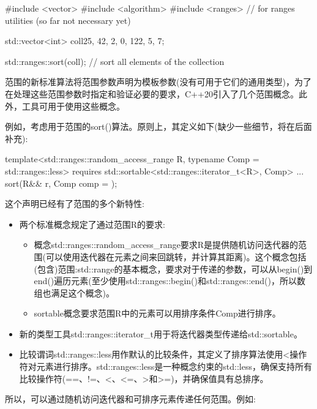 \begin{cpp}
#include <vector>
#include <algorithm>
#include <ranges> // for ranges utilities (so far not necessary yet)

std::vector<int> coll{25, 42, 2, 0, 122, 5, 7};

std::ranges::sort(coll); // sort all elements of the collection
\end{cpp}


范围的新标准算法将范围参数声明为模板参数(没有可用于它们的通用类型)，为了在处理这些范围参数时指定和验证必要的要求，C++20引入了几个范围概念。此外，工具可用于使用这些概念。

例如，考虑用于范围的sort()算法。原则上，其定义如下(缺少一些细节，将在后面补充):

\begin{cpp}
template<std::ranges::random_access_range R,
		typename Comp = std::ranges::less>
requires std::sortable<std::ranges::iterator_t<R>, Comp>
... sort(R&& r, Comp comp = {});
\end{cpp}

这个声明已经有了范围的多个新特性:

\begin{itemize}
\item
两个标准概念规定了通过范围R的要求:

\begin{itemize}
\item
概念std::ranges::random\_access\_range要求R是提供随机访问迭代器的范围(可以使用迭代器在元素之间来回跳转，并计算其距离)。这个概念包括(包含)范围:std::range的基本概念，要求对于传递的参数，可以从begin()到end()遍历元素(至少使用std::ranges::begin()和std::ranges::end()，所以数组也满足这个概念)。

\item
sortable概念要求范围R中的元素可以用排序条件Comp进行排序。
\end{itemize}

\item
新的类型工具std::ranges::iterator\_t用于将迭代器类型传递给std::sortable。

\item
比较谓词std::ranges::less用作默认的比较条件，其定义了排序算法使用<操作符对元素进行排序。std::ranges::less是一种概念约束的std::less，确保支持所有比较操作符(==、!=、<、<=、>和>=)，并确保值具有总排序。
\end{itemize}

所以，可以通过随机访问迭代器和可排序元素传递任何范围。例如:

